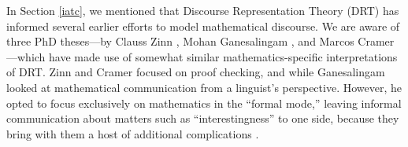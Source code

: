 \documentclass[smallextended,oneside]{svjour3}       %
\let\cite\citep
\begin{document}
In Section \ref{iatc}, we mentioned that Discourse Representation
Theory (DRT) has informed several earlier efforts to model
mathematical discourse.  We are aware of three PhD theses---by Clauss
Zinn \citeyearpar{zinn2004understanding}, Mohan Ganesalingam
\citeyearpar{ganesalingam2013language}, and Marcos Cramer
\citeyearpar{cramer2013proof}---which have made use of somewhat similar
mathematics-specific interpretations of DRT.  Zinn and Cramer
focused on proof checking, and while Ganesalingam looked
at mathematical communication from a linguist's perspective.  However,
he opted to focus exclusively on mathematics in the ``formal mode,''
leaving informal communication about matters such as
``interestingness'' to one side, because they bring with them a
host of additional complications \cite[pp.~7--8]{ganesalingam2013language}.
\end{document}
